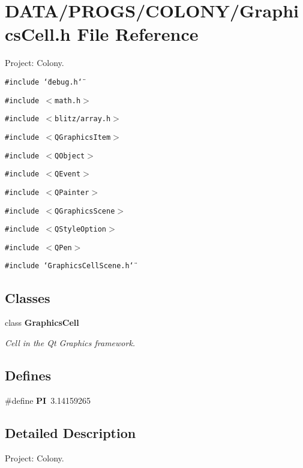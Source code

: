 \section{DATA/PROGS/COLONY/GraphicsCell.h File Reference}
\label{GraphicsCell_8h}
Project: Colony. 

{\tt \#include \char`\"{}debug.h\char`\"{}}\par
{\tt \#include $<$math.h$>$}\par
{\tt \#include $<$blitz/array.h$>$}\par
{\tt \#include $<$QGraphicsItem$>$}\par
{\tt \#include $<$QObject$>$}\par
{\tt \#include $<$QEvent$>$}\par
{\tt \#include $<$QPainter$>$}\par
{\tt \#include $<$QGraphicsScene$>$}\par
{\tt \#include $<$QStyleOption$>$}\par
{\tt \#include $<$QPen$>$}\par
{\tt \#include \char`\"{}GraphicsCellScene.h\char`\"{}}\par
\subsection*{Classes}
\begin{CompactItemize}
\item 
class {\bf GraphicsCell}
\begin{CompactList}\small\item\em Cell in the Qt Graphics framework. \item\end{CompactList}\end{CompactItemize}
\subsection*{Defines}
\begin{CompactItemize}
\item 
\#define {\bf PI}~3.14159265
\end{CompactItemize}


\subsection{Detailed Description}
Project: Colony. 

